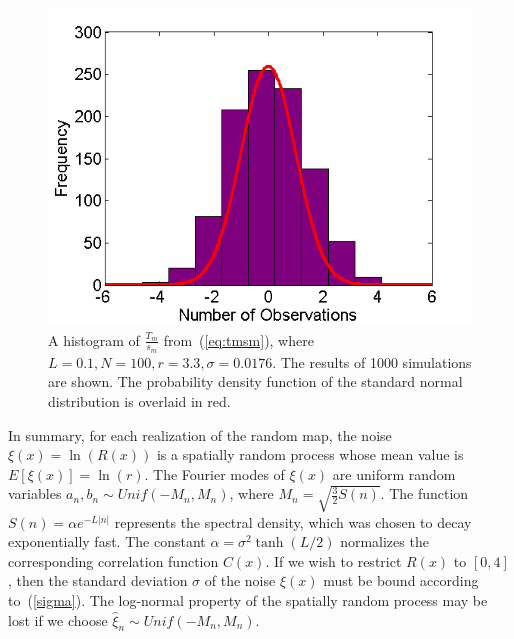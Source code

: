 \begin{figure}[!h]
\caption[A histogram of $\frac{T_m}{s_m}$]{A histogram of
  $\frac{T_m}{s_m}$ from~(\ref{eq:tmsm}), where $L=0.1,N = 100, r =
  3.3, \sigma=0.0176$. The results of 1000 simulations are shown. The probability
  density function of the standard normal distribution is
overlaid in red.}\label{fig:tmsm}
	\begin{center}
		\includegraphics[scale=0.6]{figs/tmsm.png}
	\end{center}
\end{figure}

In summary, for each realization of the random map, the noise
$\xi(x)=\ln(R(x))$ is a spatially random process whose mean value is
$E[\xi(x)]=\ln(r)$. The Fourier modes of $\xi(x)$ are uniform random
variables $a_n,b_n \sim Unif(-M_n,M_n)$, where $M_n=
\sqrt{\frac{3}{2}S(n)}$. The function $S(n)=\alpha e^{-L|n|}$
represents the spectral density, which was chosen to decay exponentially fast. The constant $\alpha = \sigma^2 \tanh(L/2)$ normalizes the corresponding
correlation function $C(x)$. If we wish to restrict $R(x)$
to $[0,4]$, then the standard deviation $\sigma$ of
the noise $\xi(x)$ must be bound according to~(\ref{sigma}). The
log-normal property of the spatially random process may be lost if we
choose $\hat{\xi}_n \sim Unif(-M_n,M_n)$.  

